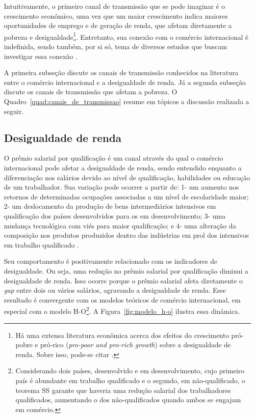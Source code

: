 Intuitivamente, o primeiro canal de transmissão que se pode imaginar é o crescimento econômico, uma vez que um maior crescimento indica maiores oportunidades de emprego e de geração de renda, que afetam diretamente a pobreza e desigualdade\footnote{Há uma extensa literatura econômica acerca dos efeitos do crescimento pró-pobre e pró-rico (\textit{pro-poor and pro-rich growth}) sobre a desigualdade de renda. Sobre isso, pode-se citar \textcite{ravallion04, thorbecke22}.}. Entretanto, sua conexão com o comércio internacional é indefinida, sendo também, por si só, tema de diversos estudos que buscam investigar essa conexão \cite{anderson16, dix17, gnangnon18}.

A primeira subseção discute os canais de transmissão conhecidos na literatura entre o comércio internacional e a desigualdade de renda. Já a segunda subseção discute os canais de transmissão que afetam a pobreza. O Quadro~\ref{quad:canais_de_transmissao} resume em tópicos a discussão realizada a seguir.


\subsection{Desigualdade de renda} \label{subsec:desigualdade_de_renda}

O prêmio salarial por qualificação é um canal através do qual o comércio internacional pode afetar a desigualdade de renda, sendo entendido enquanto a diferenciação nos salários devido ao nível de qualificação, habilidades ou educação de um trabalhador. Sua variação pode ocorrer a partir de: 1- um aumento nos retornos de determinadas ocupações associadas a um nível de escolaridade maior; 2- um deslocamento da produção de bens intermediários intensivos em qualificação dos países desenvolvidos para os em desenvolvimento; 3- uma mudança tecnológica com viés para maior qualificação; e 4- uma alteração da composição nos produtos produzidos dentro das indústrias em prol dos intensivos em trabalho qualificado \cite{goldbergpavcnik04}.

Seu comportamento é positivamente relacionado com os indicadores de desigualdade. Ou seja, uma redução no prêmio salarial por qualificação diminui a desigualdade de renda. Isso ocorre porque o prêmio salarial afeta diretamente o \textit{gap} entre dois ou vários salários, agravando a desigualdade de renda. Esse resultado é convergente com os modelos teóricos de comércio internacional, em especial com o modelo H-O\footnote{Considerando dois países, desenvolvido e em desenvolvimento, cujo primeiro país é abundante em trabalho qualificado e o segundo, em não-qualificado, o teorema SS garante que haveria uma redução salarial dos trabalhadores qualificados, aumentando o dos não-qualificados quando ambos se engajam em comércio.}. A Figura~\ref{fig:modelo_h-o} ilustra essa dinâmica.

